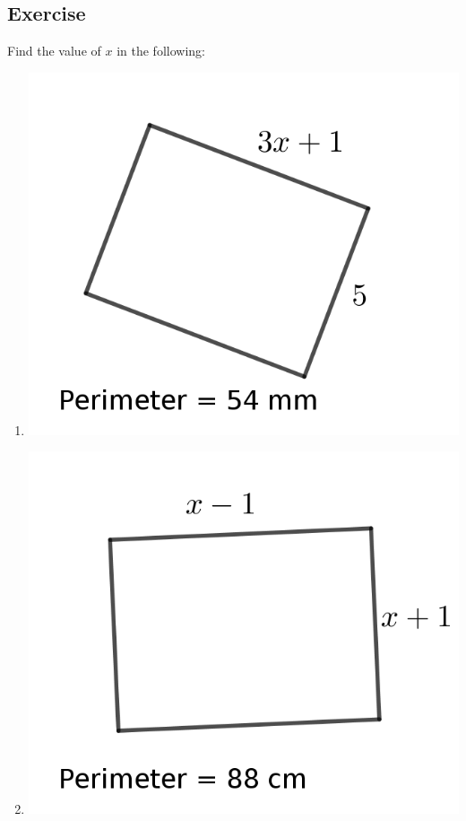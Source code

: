 \subsection{Exercise}
Find the value of $x$ in the following:
\begin{multicols}{2}
\begin{enumerate}
	\item \includegraphics{./Images/Measurement/perAlg1.png}
	\item \includegraphics{./Images/Measurement/perAlg2.png}

\end{enumerate}
\end{multicols}
